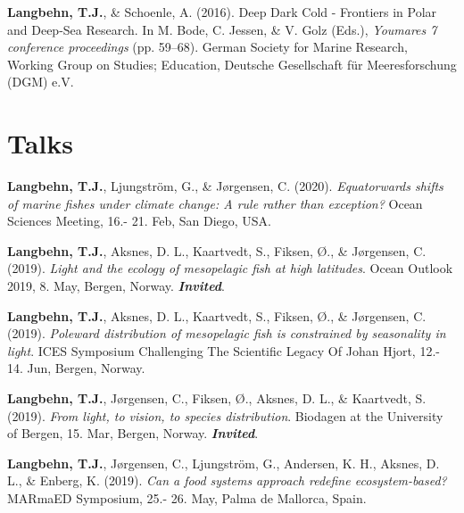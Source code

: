\documentclass[11pt, a4paper]{awesome-cv}
\begin{document}
\begingroup
\setlength{\parindent}{-0.5in}
\setlength{\leftskip}{0.5in}

\hypertarget{refs_proceedings}{}
\leavevmode\hypertarget{ref-Langbehn2016c}{}%
\textbf{Langbehn, T.J.}, \& Schoenle, A. (2016). Deep \textbar{} Dark
\textbar{} Cold - Frontiers in Polar and Deep-Sea Research. In M. Bode,
C. Jessen, \& V. Golz (Eds.), \emph{Youmares 7 conference proceedings}
(pp. 59--68). German Society for Marine Research, Working Group on
Studies; Education, Deutsche Gesellschaft für Meeresforschung (DGM) e.V.

\endgroup

\hypertarget{talks}{%
\section{Talks}\label{talks}}

\begingroup
\setlength{\parindent}{-0.5in}
\setlength{\leftskip}{0.5in}

\hypertarget{refs_talks}{}
\leavevmode\hypertarget{ref-Langbehn11}{}%
\textbf{Langbehn, T.J.}, Ljungström, G., \& Jørgensen, C. (2020).
\emph{Equatorwards shifts of marine fishes under climate change: A rule
rather than exception?} Ocean Sciences Meeting, 16.- 21. Feb, San Diego,
USA.

\leavevmode\hypertarget{ref-Langbehn6}{}%
\textbf{Langbehn, T.J.}, Aksnes, D. L., Kaartvedt, S., Fiksen, Ø., \&
Jørgensen, C. (2019). \emph{Light and the ecology of mesopelagic fish at
high latitudes}. Ocean Outlook 2019, 8. May, Bergen, Norway.
\emph{\textbf{Invited}}.

\leavevmode\hypertarget{ref-Langbehn9}{}%
\textbf{Langbehn, T.J.}, Aksnes, D. L., Kaartvedt, S., Fiksen, Ø., \&
Jørgensen, C. (2019). \emph{Poleward distribution of mesopelagic fish is
constrained by seasonality in light}. ICES Symposium Challenging The
Scientific Legacy Of Johan Hjort, 12.- 14. Jun, Bergen, Norway.

\leavevmode\hypertarget{ref-Langbehn5}{}%
\textbf{Langbehn, T.J.}, Jørgensen, C., Fiksen, Ø., Aksnes, D. L., \&
Kaartvedt, S. (2019). \emph{From light, to vision, to species
distribution}. Biodagen at the University of Bergen, 15. Mar, Bergen,
Norway. \emph{\textbf{Invited}}.

\leavevmode\hypertarget{ref-Langbehn8}{}%
\textbf{Langbehn, T.J.}, Jørgensen, C., Ljungström, G., Andersen, K. H.,
Aksnes, D. L., \& Enberg, K. (2019). \emph{Can a food systems approach
redefine ecosystem-based?} MARmaED Symposium, 25.- 26. May, Palma de
Mallorca, Spain.
\end{document}
